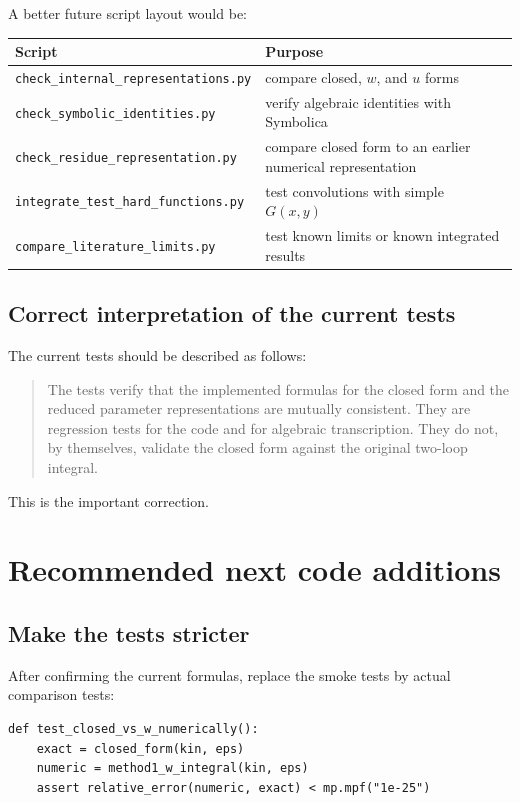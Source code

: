 \documentclass[11pt,a4paper]{article}
\begin{document}
A better future script layout would be:
\begin{center}
\begin{tabular}{ll}
\toprule
Script & Purpose \\
\midrule
\texttt{check\_internal\_representations.py} & compare closed, \(w\), and \(u\) forms \\
\texttt{check\_symbolic\_identities.py} & verify algebraic identities with Symbolica \\
\texttt{check\_residue\_representation.py} & compare closed form to an earlier numerical representation \\
\texttt{integrate\_test\_hard\_functions.py} & test convolutions with simple \(G(x,y)\) \\
\texttt{compare\_literature\_limits.py} & test known limits or known integrated results \\
\bottomrule
\end{tabular}
\end{center}

\subsection{Correct interpretation of the current tests}

The current tests should be described as follows:
\begin{quote}
The tests verify that the implemented formulas for the closed form and the reduced parameter representations are mutually consistent. They are regression tests for the code and for algebraic transcription. They do not, by themselves, validate the closed form against the original two-loop integral.
\end{quote}

This is the important correction.

\section{Recommended next code additions}

\subsection{Make the tests stricter}

After confirming the current formulas, replace the smoke tests by actual comparison tests:

\begin{lstlisting}
def test_closed_vs_w_numerically():
    exact = closed_form(kin, eps)
    numeric = method1_w_integral(kin, eps)
    assert relative_error(numeric, exact) < mp.mpf("1e-25")
\end{lstlisting}
\end{document}
